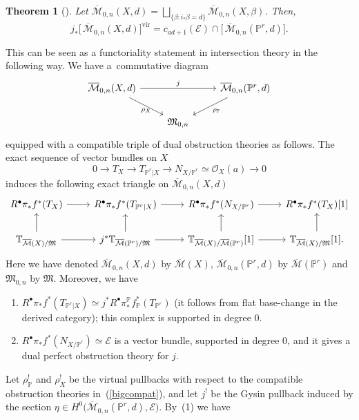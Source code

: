 \documentclass[pdftex]{sigma}
\numberwithin{equation}{section}
\newtheorem{Theorem}{Theorem}[section]
\newcommand{\vv}{\mathrm{vir}}
\newcommand{\PP}{\mathbb P}
\newcommand{\MM}[4]{\overline{\mathcal M}_{#1,#2}(#3,#4)}
\begin{document}
\begin{Theorem}[\cite{KKP}] Let $\MM{0}{n}{X}{d}=\bigsqcup_{\{\beta\colon i_*\beta=d\}}\MM{0}{n}{X}{\beta}$. Then,
 \[
 j_*\big[\,\MM{0}{n}{X}{d}\big]^{\vv}=c_{ad+1}(\mathcal{E})\cap\big[\,\MM{0}{n}{\mathbb P^r}{d}\big].
 \]
\end{Theorem}
This can be seen as a functoriality statement in intersection theory in the following way. We have a~commutative diagram
\[
\begin{tikzcd}
 \MM{0}{n}{X}{d} \ar[rr,"j"]\ar[dr,"\rho_X" below] & & \MM{0}{n}{\mathbb P^r}{d} \ar[dl,"\rho_\mathbb P"] \\
 & \mathfrak{M}_{0,n} &
\end{tikzcd}
\]
equipped with a compatible triple of dual obstruction theories as follows. The exact sequence of vector bundles on $X$
\[
 0\to T_X\to T_{\mathbb P^r|X}\to N_{X/\mathbb P^r}\simeq \mathcal O_X(a)\to 0
\]
induces the following exact triangle on $\MM{0}{n}{X}{d}$
\begin{equation}\label{bigcompat}
 \begin{tikzcd}
R^\bullet\pi_*f^* (T_X)\ar[r] & R^\bullet\pi_*f^* (T_{\mathbb P^r|X})\ar[r] & R^\bullet\pi_*f^* (N_{X/\mathbb P^r})\ar[r] & R^\bullet\pi_*f^* (T_X)[1]\\
\mathbb T_{\overline{\mathcal M}(X)/\mathfrak M}\ar[r]\ar[u] & j^*\mathbb T_{\overline{\mathcal M}(\mathbb P^r)/\mathfrak M}\ar[r]\ar[u] & \mathbb T_{\overline{\mathcal M}(X)/\overline{\mathcal M}(\mathbb P^r)}[1]\ar[r]\ar[u] & \mathbb T_{\overline{\mathcal M}(X)/\mathfrak M}[1]\ar[u].
 \end{tikzcd}
\end{equation}
Here we have denoted $\MM{0}{n}{X}{d}$ by $\overline{\mathcal M}(X)$, $\MM{0}{n}{\mathbb P^r}{d}$ by $\overline{\mathcal M}(\mathbb P^r)$ and $\mathfrak M_{0,n}$ by $\mathfrak M$. Moreover, we have
\begin{enumerate}\itemsep=0pt
 \item $R^\bullet\pi_*f^* (T_{\mathbb P^r|X})\simeq j^*R^\bullet\pi^{\mathbb P}_*f_{\mathbb P}^* (T_{\mathbb P^r})$ (it follows from flat base-change in the derived category); this complex is supported in degree 0.
 \item $R^\bullet\pi_*f^* (N_{X/\mathbb P^r})\simeq \mathcal{E}$ is a vector bundle, supported in degree 0, and it gives a dual perfect obstruction theory for $j$.
\end{enumerate}
Let $\rho_{\PP}^!$ and $\rho_{X}^!$ be the virtual pullbacks with respect to the compatible obstruction theories in~(\ref{bigcompat}), and let $j^!$ be the Gysin pullback induced by the section $\eta\in H^0\big(\MM{0}{n}{\mathbb P^r}{d},\mathcal{E}\big)$. By~(1) we have
\end{document}
